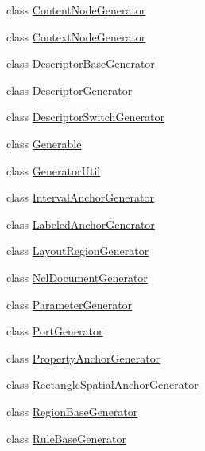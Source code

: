 \begin{DoxyCompactItemize}
\item 
class \hyperlink{classbr_1_1ufscar_1_1lince_1_1ncl_1_1generator_1_1ContentNodeGenerator}{ContentNodeGenerator}
\item 
class \hyperlink{classbr_1_1ufscar_1_1lince_1_1ncl_1_1generator_1_1ContextNodeGenerator}{ContextNodeGenerator}
\item 
class \hyperlink{classbr_1_1ufscar_1_1lince_1_1ncl_1_1generator_1_1DescriptorBaseGenerator}{DescriptorBaseGenerator}
\item 
class \hyperlink{classbr_1_1ufscar_1_1lince_1_1ncl_1_1generator_1_1DescriptorGenerator}{DescriptorGenerator}
\item 
class \hyperlink{classbr_1_1ufscar_1_1lince_1_1ncl_1_1generator_1_1DescriptorSwitchGenerator}{DescriptorSwitchGenerator}
\item 
class \hyperlink{classbr_1_1ufscar_1_1lince_1_1ncl_1_1generator_1_1Generable}{Generable}
\item 
class \hyperlink{classbr_1_1ufscar_1_1lince_1_1ncl_1_1generator_1_1GeneratorUtil}{GeneratorUtil}
\item 
class \hyperlink{classbr_1_1ufscar_1_1lince_1_1ncl_1_1generator_1_1IntervalAnchorGenerator}{IntervalAnchorGenerator}
\item 
class \hyperlink{classbr_1_1ufscar_1_1lince_1_1ncl_1_1generator_1_1LabeledAnchorGenerator}{LabeledAnchorGenerator}
\item 
class \hyperlink{classbr_1_1ufscar_1_1lince_1_1ncl_1_1generator_1_1LayoutRegionGenerator}{LayoutRegionGenerator}
\item 
class \hyperlink{classbr_1_1ufscar_1_1lince_1_1ncl_1_1generator_1_1NclDocumentGenerator}{NclDocumentGenerator}
\item 
class \hyperlink{classbr_1_1ufscar_1_1lince_1_1ncl_1_1generator_1_1ParameterGenerator}{ParameterGenerator}
\item 
class \hyperlink{classbr_1_1ufscar_1_1lince_1_1ncl_1_1generator_1_1PortGenerator}{PortGenerator}
\item 
class \hyperlink{classbr_1_1ufscar_1_1lince_1_1ncl_1_1generator_1_1PropertyAnchorGenerator}{PropertyAnchorGenerator}
\item 
class \hyperlink{classbr_1_1ufscar_1_1lince_1_1ncl_1_1generator_1_1RectangleSpatialAnchorGenerator}{RectangleSpatialAnchorGenerator}
\item 
class \hyperlink{classbr_1_1ufscar_1_1lince_1_1ncl_1_1generator_1_1RegionBaseGenerator}{RegionBaseGenerator}
\item 
class \hyperlink{classbr_1_1ufscar_1_1lince_1_1ncl_1_1generator_1_1RuleBaseGenerator}{RuleBaseGenerator}

\end{DoxyCompactItemize}
